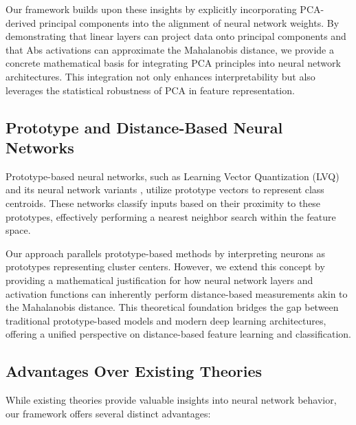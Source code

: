 Our framework builds upon these insights by explicitly incorporating PCA-derived principal components into the alignment of neural network weights. By demonstrating that linear layers can project data onto principal components and that Abs activations can approximate the Mahalanobis distance, we provide a concrete mathematical basis for integrating PCA principles into neural network architectures. This integration not only enhances interpretability but also leverages the statistical robustness of PCA in feature representation.

\subsection{Prototype and Distance-Based Neural Networks}

Prototype-based neural networks, such as Learning Vector Quantization (LVQ) \citep{teuvo1996learning} and its neural network variants \citep{gross1999generalized}, utilize prototype vectors to represent class centroids. These networks classify inputs based on their proximity to these prototypes, effectively performing a nearest neighbor search within the feature space.

Our approach parallels prototype-based methods by interpreting neurons as prototypes representing cluster centers. However, we extend this concept by providing a mathematical justification for how neural network layers and activation functions can inherently perform distance-based measurements akin to the Mahalanobis distance. This theoretical foundation bridges the gap between traditional prototype-based models and modern deep learning architectures, offering a unified perspective on distance-based feature learning and classification.

\subsection{Advantages Over Existing Theories}

While existing theories provide valuable insights into neural network behavior, our framework offers several distinct advantages:

